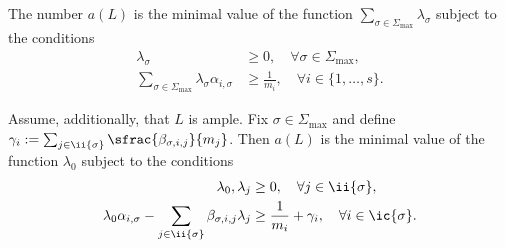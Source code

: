 \skpt
\begin{proposition}
\label{prop:description_a}
\begin{enumeratei}
\item
\label{item:global_a}
The number $a(L)$ is the minimal value of the function
$\sum_{\sigma\in\Sigma_{\max}}\lambda_\sigma$ subject to the conditions
\begin{align}
\label{eq:item:global_a_condition_variables}
\lambda_{\sigma}&\geq0,\quad\forall \sigma\in\Sigma_{\max},\\
\label{eq:item:global_a_condition_effective}
\sum_{\sigma\in\Sigma_{\max}}\lambda_\sigma \alpha_{i,\sigma}
&\geq \frac 1{m_i}, \quad \forall i\in\{1,\dots,s\}.
\end{align}
\item
\label{item:local_a}
Assume, additionally, that $L$ is ample. Fix $\sigma\in\Sigma_{\max}$ and
define $\gamma_i:=\sum_{j\in\ii{\sigma}}\sfrac {\beta_{\sigma,i,j}}{m_j}$.
Then $a(L)$ is the minimal value of the function $\lambda_0$ subject to the conditions
\begin{align}
\label{eq:item:local_a_condition_variables}
\lambda_0, \lambda_j&\geq0, \quad\forall j\in\ii{\sigma},\\
\label{eq:item:local_a_condition_effective}
\lambda_0 \alpha_{i,\sigma} -\sum_{j\in \ii{\sigma}}\beta_{\sigma,i,j}\lambda_j
&\geq \frac 1{m_i}+\gamma_i, \quad \forall i\in\ic{\sigma}.
\end{align}
\end{enumeratei}
\end{proposition}
